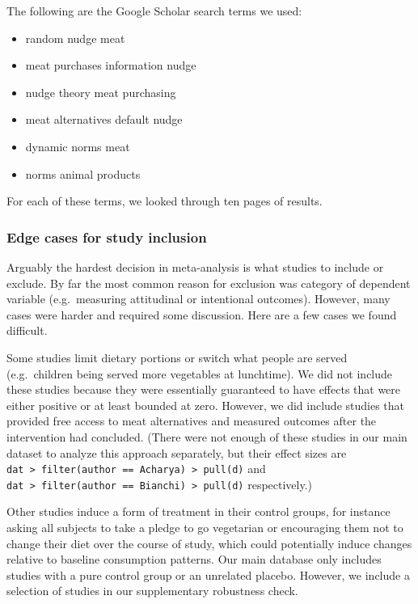 \documentclass[sn-nature,pdflatex]{sn-jnl}
\providecommand{\tightlist}{%
  \setlength{\itemsep}{0pt}\setlength{\parskip}{0pt}}
\begin{document}
The following are the Google Scholar search terms we used:

\begin{itemize}
\tightlist
\item
  random nudge meat
\item
  meat purchases information nudge
\item
  nudge theory meat purchasing
\item
  meat alternatives default nudge
\item
  dynamic norms meat
\item
  norms animal products
\end{itemize}

For each of these terms, we looked through ten pages of results.

\subsubsection{Edge cases for study
inclusion}\label{edge-cases-for-study-inclusion}

Arguably the hardest decision in meta-analysis is what studies to
include or exclude. By far the most common reason for exclusion was
category of dependent variable (e.g.~measuring attitudinal or
intentional outcomes). However, many cases were harder and required some
discussion. Here are a few cases we found difficult.

Some studies limit dietary portions or switch what people are served
(e.g.~children being served more vegetables at lunchtime). We did not
include these studies because they were essentially guaranteed to have
effects that were either positive or at least bounded at zero. However,
we did include studies that provided free access to meat alternatives
\citep{acharya2004, bianchi2022} and measured outcomes after the
intervention had concluded. (There were not enough of these studies in
our main dataset to analyze this approach separately, but their effect
sizes are
\texttt{dat\ \textbar{}\textgreater{}\ filter(author\ ==\ \textquotesingle{}Acharya\textquotesingle{})\ \textbar{}\textgreater{}\ pull(d)}
and
\texttt{dat\ \textbar{}\textgreater{}\ filter(author\ ==\ \textquotesingle{}Bianchi\textquotesingle{})\ \textbar{}\textgreater{}\ pull(d)}
respectively.)

Other studies induce a form of treatment in their control groups, for
instance asking all subjects to take a pledge to go vegetarian or
encouraging them not to change their diet over the course of study,
which could potentially induce changes relative to baseline consumption
patterns. Our main database only includes studies with a pure control
group or an unrelated placebo. However, we include a selection of
studies in our supplementary robustness check.
\end{document}
